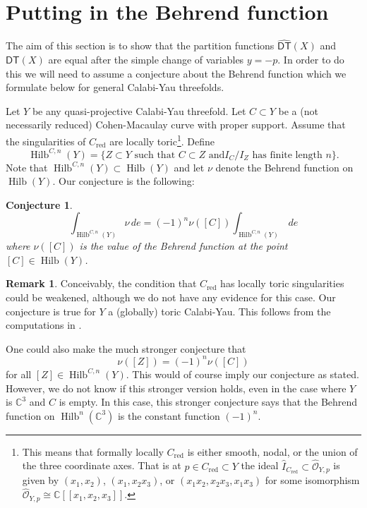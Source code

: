 \documentclass{amsart}
\newtheorem{conjecture}[theorem]{Conjecture}
\theoremstyle{definition}
\newtheorem{remark}[theorem]{Remark}
\newcommand{\CC} {\mathbb{C}}          %
\newcommand{\Hilb}{\operatorname{Hilb}}
\newcommand{\DT}{\mathsf{DT}}
\newcommand{\DThat}{\widehat{\DT}}
\newcommand{\red}{\mathrm{red}}
\begin{document}
\section{Putting in the Behrend function} \label{sec: Behrend}

The aim of this section is to show that the partition functions
$\DThat (X)$ and $\DT (X)$ are equal after the simple change of
variables $y=-p$. In order to do this we will need to assume a
conjecture about the Behrend function which we formulate below for
general Calabi-Yau threefolds.

Let $Y$ be any quasi-projective Calabi-Yau
threefold.  Let $C\subset Y$ be a (not necessarily reduced)
Cohen-Macaulay curve with proper support. Assume that the
singularities of $C_{\red}$ are locally toric\footnote{This means that
formally locally $C_{\red}$ is either smooth, nodal, or the union of
the three coordinate axes. That is at $p\in C_{\red}\subset Y$ the
ideal $\widehat{I}_{C_{\red}}\subset \widehat{\mathcal{O}}_{Y,p}$ is
given by $(x_{1},x_{2})$, $(x_{1},x_{2}x_{3})$, or
$(x_{1}x_{2},x_{2}x_{3},x_{1}x_{3})$ for some isomorphism
$\widehat{\mathcal{O}}_{Y,p}\cong \CC
[[x_{1},x_{2},x_{3}]]$. }. Define\emph{
\[
\Hilb^{C,n}(Y) = \{Z\subset Y \text{ such that $C\subset Z$ and
$I_{C}/I_{Z}$ has finite length $n$} \}.
\]
}
Note that $\Hilb^{C,n}(Y)\subset \Hilb (Y)$ and let $\nu$ denote the
Behrend function on $\Hilb (Y)$. Our conjecture is the following:

\begin{conjecture}\label{conj: Behrend fnc conj}
\[
\int_{\Hilb^{C,n}(Y)} \nu \, de = (-1)^{n} \nu ([C]) \int_{\Hilb^{C,n}(Y)} \, de
\]
where $\nu ([C])$ is the value of the Behrend function at the point $[C]\in \Hilb (Y)$.
\end{conjecture}

\begin{remark}
Conceivably, the condition that $C_{\red}$ has locally toric
singularities could be weakened, although we do not have any evidence
for this case. Our conjecture is true for $Y$ a (globally) toric
Calabi-Yau. This follows from the computations in \cite{MNOP1}.

One could also make the much stronger conjecture that 
\[
\nu ([Z]) = (-1)^{n} \nu ([C])
\]
for all $[Z]\in \Hilb^{C,n}(Y)$. This would of course imply our
conjecture as stated. However, we do not know if this stronger version
holds, even in the case where $Y$ is $\CC^{3}$ and $C$ is empty. In
this case, this stronger conjecture says that the Behrend function
on $\Hilb^{n}(\CC^{3})$ is the constant function $(-1)^{n}$.
\end{remark}
\end{document}

